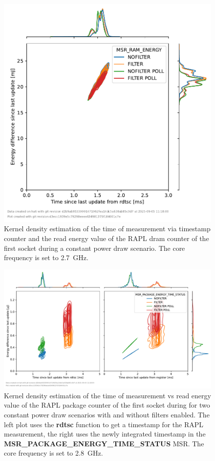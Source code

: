 \begin{figure}[]
    \centering
    \includegraphics[width=0.54\columnwidth]{fig/rapl-update-intervals/MSR_RAM_ENERGY_2700000.pdf}
    \caption{Kernel density estimation of the time of measurement via timestamp counter and the read energy value of the RAPL dram counter of the first socket during a constant power draw scenario.
    The core frequency is set to \SI{2.7}{\GHz}.}
\end{figure}

\clearpage
\begin{figure}[]
    \centering
    \includegraphics[width=\columnwidth]{fig/rapl-update-intervals/MSR_PACKAGE_ENERGY_TIME_STATUS_2800000.pdf}
    \caption{Kernel density estimation of the time of measurement vs read energy value of the RAPL package counter of the first socket during for two constant power draw scenarios with and without filters enabled.
    The left plot uses the \textbf{rdtsc} function to get a timestamp for the RAPL measurement, the right uses the newly integrated timestamp in the \textbf{MSR\_PACKAGE\_ENERGY\_TIME\_STATUS} MSR.
    The core frequency is set to \SI{2.8}{\GHz}.}
\end{figure}

